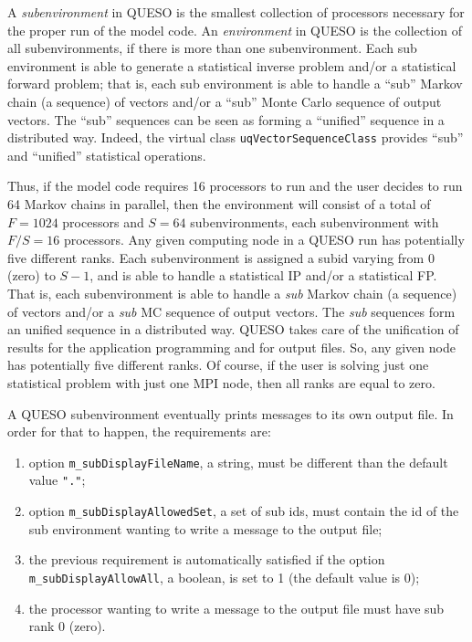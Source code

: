 A {\it subenvironment} in QUESO is the smallest collection of processors necessary for the proper run of the model code.
An {\it environment} in QUESO is the collection of all subenvironments, if there is more than one subenvironment. %
    Each sub environment is able to generate a statistical inverse problem and/or a statistical forward problem; that is, each sub environment is able to handle a ``sub'' Markov chain (a sequence) of vectors and/or a ``sub'' Monte Carlo sequence of output vectors.
    The ``sub'' sequences can be seen as forming a ``unified'' sequence in a distributed way.
    Indeed, the virtual class \verb+uqVectorSequenceClass+ provides ``sub'' and ``unified'' statistical operations. 

Thus, if the model code requires 16 processors to run and the user decides to run 64 Markov chains in parallel,
then the environment will consist of a total of $F=1024$ processors and $S=64$ subenvironments, each subenvironment with $F/S=16$ processors.
Any given computing node in a QUESO run has potentially five different ranks.
Each subenvironment is assigned a subid varying from $0$ (zero) to $S-1$, and is able to handle a statistical IP and/or a statistical FP.
That is, each subenvironment is able to handle a {\it sub} Markov chain (a sequence) of vectors and/or a {\it sub} MC sequence of output vectors.
The {\it sub} sequences form an unified sequence in a distributed way.
QUESO takes care of the unification of results for the application programming and for output files. So, any given node has potentially five different ranks. Of course, if the user is solving just one statistical problem with just one MPI node, then all ranks are equal to zero.

A QUESO subenvironment eventually prints messages to its own output file. In order for that to happen, the requirements are:
\begin{enumerate}
 \item option \verb+m_subDisplayFileName+, a string, must be different than the default value \verb+"."+;
\item  option \verb+m_subDisplayAllowedSet+, a set of sub ids, must contain the id of the sub environment wanting to write a message to the output file;
\item  the previous requirement is automatically satisfied if the option \verb+m_subDisplayAllowAll+, a boolean, is set to 1 (the default value is 0);
\item  the processor wanting to write a message to the output file must have sub rank 0 (zero).
\end{enumerate}

